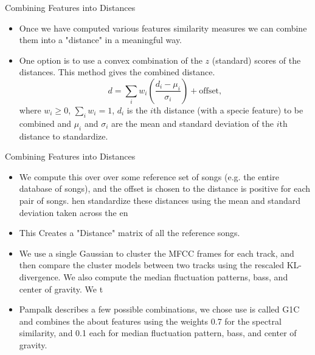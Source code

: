 \documentclass[xcolor=dvipsnames,t]{beamer} %
\begin{document}
\begin{frame}{Combining Features into Distances}

\begin{itemize}
\item Once we have computed various features similarity measures we can combine them into a "distance" in a meaningful way. 
\item One option is to use a convex combination of the $z$ (standard) scores of the distances. This method gives the combined distance.
 \[ d = \sum_{i} w_i \left(\dfrac{d_i - \mu_i}{\sigma_i}\right) + \text{offset}, \]
 where  $w_i\ge 0$, $\sum_i w_i=1$, $d_i$ is the $i$th distance (with a specie feature) to be combined and $\mu_i$ and $\sigma_i$ are the mean and standard deviation of the $i$th distance to standardize. 
 \end{itemize}
 \end{frame}
 \begin{frame}{Combining Features into Distances}

\begin{itemize}
 \item We compute this over over some reference set of songs (e.g. the entire database of songs), and the offset is chosen to the distance is positive for each pair of songs.
hen standardize these distances using the mean and standard deviation taken across the en
 \item This Creates a "Distance" matrix of all the reference songs. 
  \item We use a single Gaussian to cluster the MFCC frames for each track, and then compare the cluster models between two tracks using the rescaled KL- divergence. We also compute the median fluctuation patterns, bass, and center of gravity. We t
 \item Pampalk describes a few possible combinations, we chose use is called G1C and combines the about features using the weights 0.7 for the spectral similarity, and 0.1 each for median fluctuation pattern, bass, and center of gravity.
 \end{itemize}
\end{frame}
\end{document}
